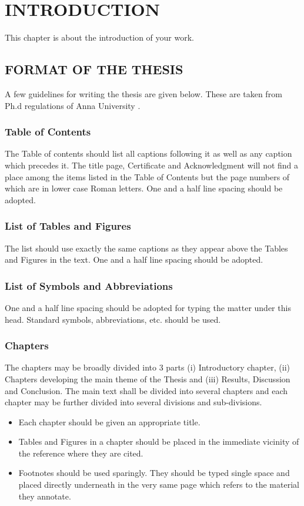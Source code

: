 
\chapter{\uppercase{Introduction}} %
\label{intro} %
This chapter is about the introduction of your work. 
\section{\uppercase{Format of the thesis}}
A few guidelines for writing the thesis are given below. These are taken from Ph.d regulations of Anna University \cite{regulations}. 
\subsection{Table of Contents}
The Table of contents should list all captions following it as well as any caption which precedes it. The title page, Certificate and Acknowledgment will not find a place among the items listed in the Table of Contents but the page numbers of which are in lower case Roman letters. One and a half line spacing should be adopted. 
\subsection{List of Tables and Figures}
The list should use exactly the same captions as they appear above the Tables and Figures in the text. One and a half line spacing should be adopted.
\newpage
\subsection{List of Symbols and Abbreviations}
One and a half line spacing should be adopted for typing the matter under this head. Standard symbols, abbreviations, etc.
should be used.
\subsection{Chapters}
The chapters may be broadly divided into 3 parts (i) Introductory chapter, (ii) Chapters developing the main theme of the Thesis and (iii) Results, Discussion and Conclusion. The main text shall be divided into several chapters and each chapter may be further divided into several divisions and sub-divisions. 
\begin{itemize}
 \item Each chapter should be given an appropriate title.
 \item Tables and Figures in a chapter should be placed in the immediate vicinity of the reference where they are cited.
 \item Footnotes should be used sparingly. They should be typed single space and
placed directly underneath in the very same page which refers to the material
they annotate.
\end{itemize}
